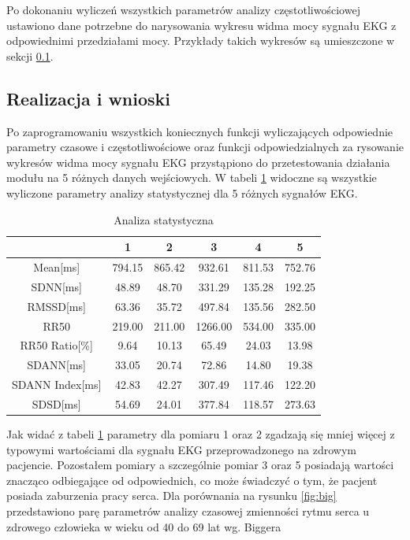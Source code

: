 \vspace{10mm}

Po dokonaniu wyliczeń wszystkich parametrów analizy częstotliwościowej ustawiono dane potrzebne
do narysowania wykresu widma mocy sygnału EKG z odpowiednimi przedziałami mocy. Przykłady takich wykresów są umieszczone
w sekcji \ref{sec:rezultat}.

\subsection{Realizacja i wnioski}
\label{sec:rezultat}

\tab Po zaprogramowaniu wszystkich koniecznych funkcji wyliczających odpowiednie parametry czasowe i częstotliwościowe oraz funkcji odpowiedzialnych za rysowanie wykresów widma mocy sygnału EKG przystąpiono do przetestowania działania modułu na 5 różnych  danych wejściowych. W tabeli \ref{tab:stats} widoczne są wszystkie wyliczone parametry analizy statystycznej dla 5 różnych sygnałów EKG.

\vspace{5mm}

\begin{table}[ht]
\caption{Analiza statystyczna}
\label{tab:stats}
\begin{tabular}{|c|c|c|c|c|c|}
 \hline
 & 1 & 2 & 3 & 4 & 5\\
\hline
Mean[ms] & 794.15  & 865.42 & 932.61 & 811.53 & 752.76\\
SDNN[ms] & 48.89 & 48.70 & 331.29 & 135.28 & 192.25\\
RMSSD[ms] & 63.36 & 35.72 & 497.84 & 135.56 & 282.50\\
RR50 & 219.00 & 211.00 & 1266.00 & 534.00 & 335.00\\
RR50 Ratio[\%] & 9.64 & 10.13 & 65.49 & 24.03 & 13.98\\
SDANN[ms] & 33.05 & 20.74 & 72.86 & 14.80 & 19.38\\
SDANN Index[ms] & 42.83 & 42.27 & 307.49 & 117.46 & 122.20\\
SDSD[ms] & 54.69 & 24.01 & 377.84 & 118.57 & 273.63\\
\hline
\end{tabular}
\end{table}

\vspace{5mm}

Jak widać z tabeli \ref{tab:stats} parametry dla pomiaru 1 oraz 2 zgadzają się mniej więcej z typowymi wartościami dla sygnału EKG przeprowadzonego na zdrowym pacjencie. Pozostałem pomiary a szczególnie pomiar 3 oraz 5 posiadają wartości znacząco odbiegające od odpowiednich, co może świadczyć o tym, że pacjent posiada zaburzenia pracy serca.
Dla porównania na rysunku \ref{fig:big} przedstawiono parę parametrów analizy czasowej zmienności rytmu serca u zdrowego człowieka w wieku od 40 do 69 lat wg. Biggera

